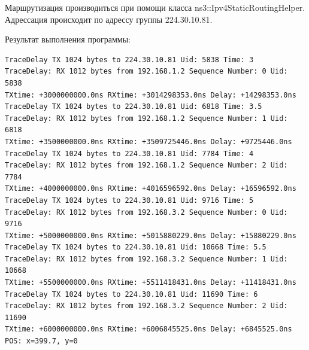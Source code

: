 \documentclass[14pt,a4paper]{article}
\begin{document}
Маршрутизация производиться при помощи класса ns3::Ipv4StaticRoutingHelper.
Адрессация происходит по адрессу группы 224.30.10.81. 

\vspace{1cm}
Результат выполнения программы:
\begin{verbatim}
TraceDelay TX 1024 bytes to 224.30.10.81 Uid: 5838 Time: 3
TraceDelay: RX 1012 bytes from 192.168.1.2 Sequence Number: 0 Uid: 5838 
TXtime: +3000000000.0ns RXtime: +3014298353.0ns Delay: +14298353.0ns
TraceDelay TX 1024 bytes to 224.30.10.81 Uid: 6818 Time: 3.5
TraceDelay: RX 1012 bytes from 192.168.1.2 Sequence Number: 1 Uid: 6818 
TXtime: +3500000000.0ns RXtime: +3509725446.0ns Delay: +9725446.0ns
TraceDelay TX 1024 bytes to 224.30.10.81 Uid: 7784 Time: 4
TraceDelay: RX 1012 bytes from 192.168.1.2 Sequence Number: 2 Uid: 7784 
TXtime: +4000000000.0ns RXtime: +4016596592.0ns Delay: +16596592.0ns
TraceDelay TX 1024 bytes to 224.30.10.81 Uid: 9716 Time: 5
TraceDelay: RX 1012 bytes from 192.168.3.2 Sequence Number: 0 Uid: 9716 
TXtime: +5000000000.0ns RXtime: +5015880229.0ns Delay: +15880229.0ns
TraceDelay TX 1024 bytes to 224.30.10.81 Uid: 10668 Time: 5.5
TraceDelay: RX 1012 bytes from 192.168.3.2 Sequence Number: 1 Uid: 10668 
TXtime: +5500000000.0ns RXtime: +5511418431.0ns Delay: +11418431.0ns
TraceDelay TX 1024 bytes to 224.30.10.81 Uid: 11690 Time: 6
TraceDelay: RX 1012 bytes from 192.168.3.2 Sequence Number: 2 Uid: 11690 
TXtime: +6000000000.0ns RXtime: +6006845525.0ns Delay: +6845525.0ns
POS: x=399.7, y=0

\end{verbatim}
\newpage
{}

\end{document}

